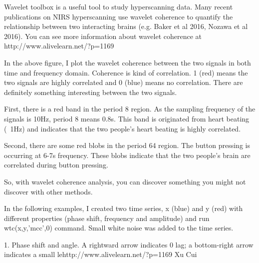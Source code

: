 \documentclass[a4paper,12pt]{article}
\begin{document}
Wavelet toolbox is a useful tool to study hyperscanning data. Many recent publications on NIRS hyperscanning use wavelet coherence to quantify the relationship between two interacting brains (e.g. Baker et al 2016, Nozawa et al 2016). You can see more information about wavelet coherence at http://www.alivelearn.net/?p=1169

In the above figure, I plot the wavelet coherence between the two signals in both time and frequency domain. Coherence is kind of correlation. 1 (red) means the two signals are highly correlated and 0 (blue) means no correlation. There are definitely something interesting between the two signals.

First, there is a red band in the period 8 region. As the sampling frequency of the signals is 10Hz, period 8 means 0.8s. This band is originated from heart beating (~1Hz) and indicates that the two people’s heart beating is highly correlated.

Second, there are some red blobs in the period 64 region. The button pressing is occurring at 6-7s frequency. These blobs indicate that the two people’s brain are correlated during button pressing.

So, with wavelet coherence analysis, you can discover something you might not discover with other methods.

In the following examples, I created two time series, x (blue) and y (red) with different properties (phase shift, frequency and amplitude) and run wtc(x,y,’mcc’,0) command. Small white noise was added to the time series.

1. Phase shift and angle. A rightward arrow indicates 0 lag; a bottom-right arrow indicates a small lehttp://www.alivelearn.net/?p=1169 Xu Cui
\end{document}
